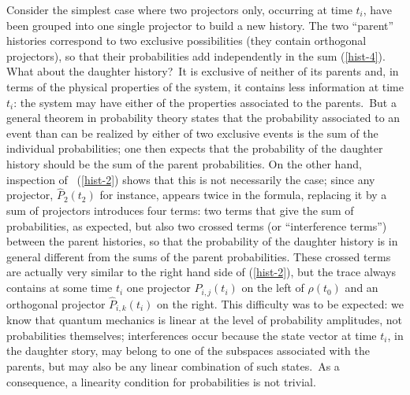 \documentclass[12pt,onecolumn]{article}%
\begin{document}
Consider the simplest case where two projectors only, occurring at time
$t_{i}$, have been grouped into one single projector to build a new history.
The two ``parent'' histories correspond to two exclusive possibilities (they
contain orthogonal projectors), so that their probabilities add independently
in the sum (\ref{hist-4}). What about the daughter history?\ It is exclusive
of neither of its parents and, in terms of the physical properties of the
system, it contains less information at time $t_{i}$: the system may have
either of the properties associated to the parents.\ But a general theorem in
probability theory states that the probability associated to an event than can
be realized by either of two exclusive events is the sum of the individual
probabilities; one then expects that the probability of the daughter history
should be the sum of the parent probabilities. On the other hand, inspection
of \ (\ref{hist-2}) shows that this is not necessarily the case; since any
projector, $\widehat{P}_{2}(t_{2})$ for instance, appears twice in the
formula, replacing it by a sum of projectors introduces four terms: two terms
that give the sum of probabilities, as expected, but also two crossed terms
(or ``interference terms'') between the parent histories, so that the
probability of the daughter history is in general different from the sums of
the parent probabilities. These crossed terms are actually very similar to the
right hand side of (\ref{hist-2}), but the trace always contains at some time
$t_{i}$ one projector $\widehat{P}_{i,j}(t_{i})$ on the left of $\rho(t_{0})$
and an orthogonal projector $\widehat{P}_{i,k}(t_{i})$ on the right. This
difficulty was to be expected: we know that quantum mechanics is linear at the
level of probability amplitudes, not probabilities themselves; interferences
occur because the state vector at time $t_{i}$, in the daughter story, may
belong to one of the subspaces associated with the parents, but may also be
any linear combination of such states.\ As a consequence, a linearity
condition for probabilities is not trivial.
\end{document}

